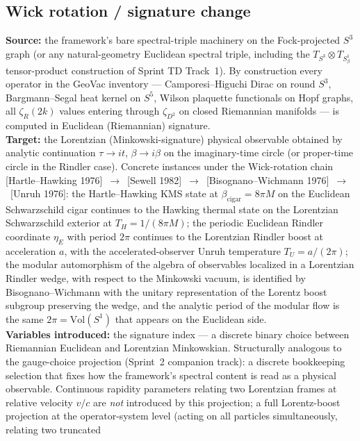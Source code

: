\subsection{Wick rotation / signature change}
\label{sec:proj_wick_rotation}
\textbf{Source:} the framework's bare spectral-triple machinery on
the Fock-projected $S^3$ graph (or any natural-geometry Euclidean
spectral triple, including the $T_{S^3} \otimes T_{S^1_\beta}$
tensor-product construction of Sprint TD Track~1).  By construction
every operator in the GeoVac inventory ---
Camporesi--Higuchi Dirac on round $S^3$, Bargmann--Segal heat
kernel on $S^5$, Wilson plaquette functionals on Hopf graphs, all
$\zeta_R(2k)$ values entering through $\zeta_{D^2}$ on closed
Riemannian manifolds --- is computed in Euclidean (Riemannian)
signature.\\
\textbf{Target:} the Lorentzian (Minkowski-signature) physical
observable obtained by analytic continuation
$\tau \to i t$, $\beta \to i \beta$ on the imaginary-time circle
(or proper-time circle in the Rindler case).  Concrete instances
under the Wick-rotation chain
[Hartle--Hawking 1976]~$\to$~[Sewell 1982]~$\to$~[Bisognano--Wichmann
1976]~$\to$~[Unruh 1976]:
the Hartle--Hawking KMS state at
$\beta_{\mathrm{cigar}} = 8\pi M$ on the Euclidean Schwarzschild
cigar continues to the Hawking thermal state on the Lorentzian
Schwarzschild exterior at $T_H = 1/(8\pi M)$; the periodic
Euclidean Rindler coordinate $\eta_E$ with period $2\pi$ continues
to the Lorentzian Rindler boost at acceleration $a$, with the
accelerated-observer Unruh temperature $T_U = a/(2\pi)$; the modular
automorphism of the algebra of observables localized in a Lorentzian
Rindler wedge, with respect to the Minkowski vacuum, is identified
by Bisognano--Wichmann with the unitary representation of the Lorentz
boost subgroup preserving the wedge, and the analytic period of the
modular flow is the same $2\pi = \mathrm{Vol}(S^1)$ that appears on
the Euclidean side.\\
\textbf{Variables introduced:} the signature index --- a discrete
binary choice between Riemannian Euclidean and Lorentzian
Minkowskian.  Structurally analogous to the gauge-choice projection
(Sprint~2 companion track): a discrete bookkeeping selection that
fixes how the framework's spectral content is read as a physical
observable.  Continuous rapidity parameters relating two Lorentzian
frames at relative velocity $v/c$ are \emph{not} introduced by this
projection; a full Lorentz-boost projection at the operator-system
level (acting on all particles simultaneously, relating two truncated
